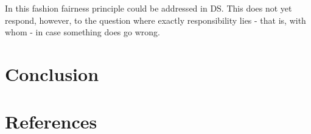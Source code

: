 \documentclass{article}
\begin{document}
In this fashion fairness principle could be addressed in DS. This does not yet respond, however, to the question where exactly responsibility lies - that is, with whom - in case something does go wrong. 

\section{Conclusion}\hypertarget{sec x}{}

\section{References}\hypertarget{sec5}{ }
\end{document}

